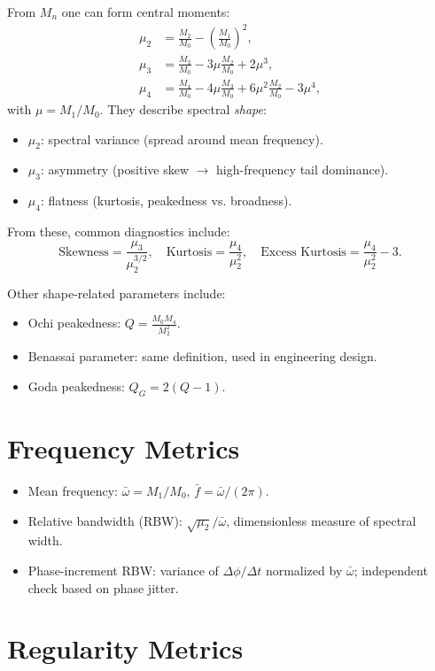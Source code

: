\documentclass[11pt]{article}
\begin{document}
From $M_n$ one can form central moments:
\begin{align}
\mu_2 &= \frac{M_2}{M_0} - \left(\frac{M_1}{M_0}\right)^2, \\
\mu_3 &= \frac{M_3}{M_0} - 3\mu\frac{M_2}{M_0} + 2\mu^3, \\
\mu_4 &= \frac{M_4}{M_0} - 4\mu\frac{M_3}{M_0} + 6\mu^2 \frac{M_2}{M_0} - 3\mu^4,
\end{align}
with $\mu = M_1/M_0$.  
They describe spectral \emph{shape}:
\begin{itemize}
  \item $\mu_2$: spectral variance (spread around mean frequency).
  \item $\mu_3$: asymmetry (positive skew $\to$ high-frequency tail dominance).
  \item $\mu_4$: flatness (kurtosis, peakedness vs. broadness).
\end{itemize}

From these, common diagnostics include:
\[
\text{Skewness} = \frac{\mu_3}{\mu_2^{3/2}}, \quad
\text{Kurtosis} = \frac{\mu_4}{\mu_2^2}, \quad
\text{Excess Kurtosis} = \frac{\mu_4}{\mu_2^2} - 3.
\]

Other shape-related parameters include:
\begin{itemize}
  \item Ochi peakedness: $Q = \tfrac{M_0 M_4}{M_2^2}$.
  \item Benassai parameter: same definition, used in engineering design.
  \item Goda peakedness: $Q_G = 2(Q-1)$.
\end{itemize}

\section{Frequency Metrics}

\begin{itemize}
  \item Mean frequency: $\bar{\omega} = M_1/M_0$, $\bar{f} = \bar{\omega}/(2\pi)$.
  \item Relative bandwidth (RBW): $\sqrt{\mu_2}/\bar{\omega}$, dimensionless measure of spectral width.
  \item Phase-increment RBW: variance of $\Delta\phi/\Delta t$ normalized by $\bar{\omega}$; independent check based on phase jitter.
\end{itemize}

\section{Regularity Metrics}
\end{document}
